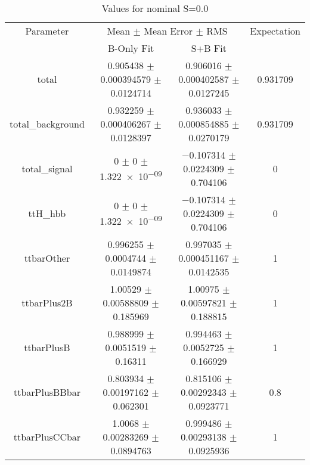 \begin{table}
\centering
\caption{Values for nominal S=0.0}
\begin{tabular}{cccc}
\toprule
Parameter & \multicolumn{2}{c}{Mean $\pm$ Mean Error $\pm$ RMS} & Expectation\\
 & B-Only Fit & S+B Fit & \\
\midrule
total & \num{0.905438} $\pm$ \num{0.000394579} $\pm$ \num{0.0124714} & \num{0.906016} $\pm$ \num{0.000402587} $\pm$ \num{0.0127245} & \num{0.931709}\\
total\_background & \num{0.932259} $\pm$ \num{0.000406267} $\pm$ \num{0.0128397} & \num{0.936033} $\pm$ \num{0.000854885} $\pm$ \num{0.0270179} & \num{0.931709}\\
total\_signal & \num{0} $\pm$ \num{0} $\pm$ \num{1.322e-09} & \num{-0.107314} $\pm$ \num{0.0224309} $\pm$ \num{0.704106} & \num{0}\\
ttH\_hbb & \num{0} $\pm$ \num{0} $\pm$ \num{1.322e-09} & \num{-0.107314} $\pm$ \num{0.0224309} $\pm$ \num{0.704106} & \num{0}\\
ttbarOther & \num{0.996255} $\pm$ \num{0.0004744} $\pm$ \num{0.0149874} & \num{0.997035} $\pm$ \num{0.000451167} $\pm$ \num{0.0142535} & \num{1}\\
ttbarPlus2B & \num{1.00529} $\pm$ \num{0.00588809} $\pm$ \num{0.185969} & \num{1.00975} $\pm$ \num{0.00597821} $\pm$ \num{0.188815} & \num{1}\\
ttbarPlusB & \num{0.988999} $\pm$ \num{0.0051519} $\pm$ \num{0.16311} & \num{0.994463} $\pm$ \num{0.0052725} $\pm$ \num{0.166929} & \num{1}\\
ttbarPlusBBbar & \num{0.803934} $\pm$ \num{0.00197162} $\pm$ \num{0.062301} & \num{0.815106} $\pm$ \num{0.00292343} $\pm$ \num{0.0923771} & \num{0.8}\\
ttbarPlusCCbar & \num{1.0068} $\pm$ \num{0.00283269} $\pm$ \num{0.0894763} & \num{0.999486} $\pm$ \num{0.00293138} $\pm$ \num{0.0925936} & \num{1}\\
\bottomrule
\end{tabular}
\end{table}